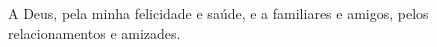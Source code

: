 
\begin{agradecimentos}
A Deus, pela minha felicidade e saúde, e a familiares e amigos, pelos relacionamentos e amizades. 
\end{agradecimentos}
